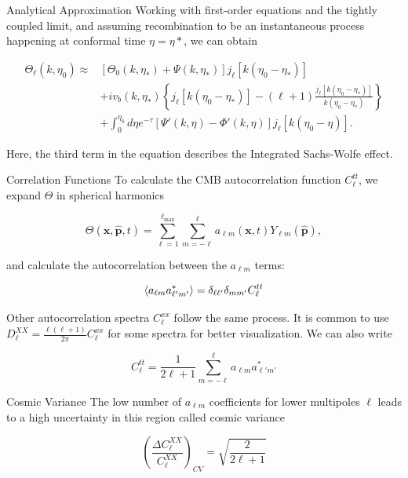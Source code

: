 \documentclass[serif, aspectratio=169]{beamer}
\begin{document}
\begin{frame}{Analytical Approximation}
Working with first-order equations and the tightly coupled limit, and assuming recombination to be an instantaneous process happening at conformal time $\eta=\eta*$, we can obtain

\begin{equation}\label{Thetal_approx}
\begin{split}
    \Theta_\ell(k,\eta_0)\approx &[\Theta_0(k,\eta_*)+\Psi(k,\eta_*)]j_\ell[k(\eta_0-\eta_*)]\\
    &+iv_b(k,\eta_*)\left\{j_\ell[k(\eta_0-\eta_*)]-(\ell+1)\frac{j_\ell[k(\eta_0-\eta_*)]}{k(\eta_0-\eta_*)}\right\}\\
    &+\int_0^{\eta_0} d\eta e^{-\tau}[\Psi'(k,\eta)-\Phi'(k,\eta)]j_\ell[k(\eta_0-\eta)].
\end{split}
\end{equation}

Here, the third term in the equation describes the Integrated Sachs-Wolfe effect.
\end{frame}

\begin{frame}{Correlation Functions}
To calculate the CMB autocorrelation function $C_\ell^{tt}$, we expand $\Theta$ in spherical harmonics

\begin{equation}
    \Theta(\mathbf{x}, \hat{\mathbf{p}},t)=\sum_{\ell=1}^{\ell_\text{max}}\sum_{m=-\ell}^\ell a_{\ell m}(\mathbf{x},t)Y_{\ell m}(\hat{\mathbf{p}}),
\end{equation}

and calculate the autocorrelation between the $a_{\ell m}$ terms:

\begin{equation}
    \left\langle a_{\ell m} a_{\ell' m'}^* \right\rangle=\delta_{\ell \ell'}\delta_{m m'}C_\ell^{tt}
\end{equation}

Other autocorrelation spectra $C_\ell^{xx}$ follow the same process. It is common to use $D_\ell^{XX}=\frac{\ell(\ell+1)}{2\pi}C_\ell^{xx}$ for some spectra for better visualization. We can also write

\begin{equation}
	C_\ell^{tt}=\frac{1}{2\ell+1}\sum_{m=-\ell}^\ell a_{\ell m}a_{\ell' m'}^*
\end{equation}

\end{frame}

\begin{frame}{Cosmic Variance}
    The low number of $a_{\ell m}$ coefficients for lower multipoles $\ell$ leads to a high uncertainty in this region called cosmic variance

    \begin{equation}\label{cosmic_variance}
        \left(\frac{\Delta C_\ell^{XX}}{C_\ell^{XX}}\right)_{CV}=\sqrt{\frac{2}{2\ell+1}}
    \end{equation}
\end{frame}
\end{document}
